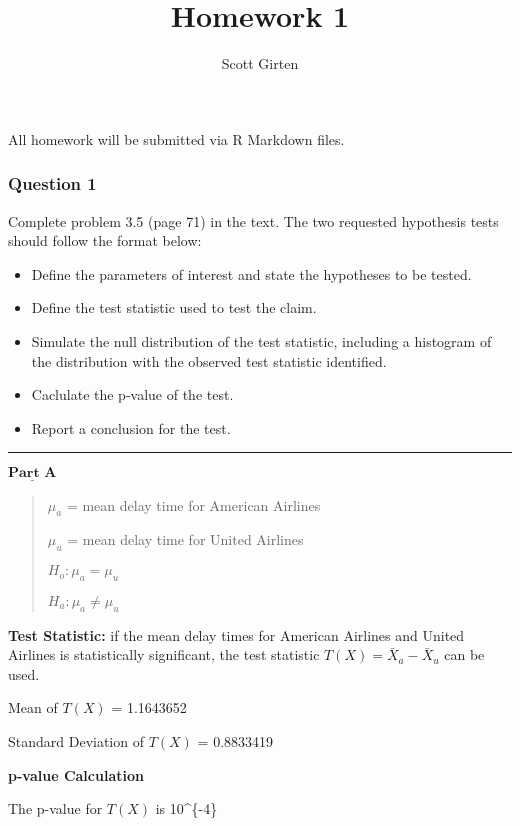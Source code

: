 \documentclass[]{article}
\title{Homework 1}
\author{Scott Girten}
\date{}
\providecommand{\tightlist}{%
  \setlength{\itemsep}{0pt}\setlength{\parskip}{0pt}}
\begin{document}
\maketitle

All homework will be submitted via R Markdown files.

\subsubsection{Question 1}\label{question-1}

Complete problem 3.5 (page 71) in the text. The two requested hypothesis
tests should follow the format below:

\begin{itemize}
\tightlist
\item
  Define the parameters of interest and state the hypotheses to be
  tested.
\item
  Define the test statistic used to test the claim.
\item
  Simulate the null distribution of the test statistic, including a
  histogram of the distribution with the observed test statistic
  identified.
\item
  Caclulate the p-value of the test.
\item
  Report a conclusion for the test.
\end{itemize}

\begin{center}\rule{0.5\linewidth}{\linethickness}\end{center}

\(\underline{\textbf{Part A}}\)

\begin{quote}
\(\mu_a\) = mean delay time for American Airlines

\(\mu_u\) = mean delay time for United Airlines

\(H_o : \mu_a = \mu_u\)

\(H_a : \mu_a \ne \mu_u\)
\end{quote}

\textbf{Test Statistic:} if the mean delay times for American Airlines
and United Airlines is statistically significant, the test statistic
\(T(X) = \bar{X}_a - \bar{X}_u\) can be used.

Mean of \(T(X)\) = 1.1643652

Standard Deviation of \(T(X)\) = 0.8833419

\textbf{p-value Calculation}

The p-value for \(T(X)\) is 10\^{}\{-4\}
\end{document}
